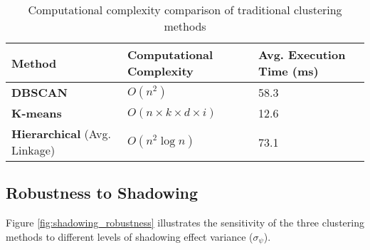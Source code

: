 \begin{table}[htbp]
    \centering
    \caption{Computational complexity comparison of traditional clustering methods}
    \label{tab:complexity_comparison}
    \begin{tcolorbox}[enhanced, colback=white, colframe=green!75!black, 
                      title={\textbf{Computational Performance Analysis}},
                      fonttitle=\bfseries, 
                      width=0.9\linewidth,
                      drop shadow southeast]
    \begin{tabular}{l>{\centering\arraybackslash}p{4cm}>{\centering\arraybackslash}p{3cm}}
        \toprule
        \rowcolor{green!20}
        \textbf{Method} & \textbf{Computational Complexity} & \textbf{Avg. Execution Time (ms)} \\
        \midrule
        \textbf{DBSCAN} & $O(n^2)$ & \cellcolor{yellow!10}58.3 \\
        \textbf{K-means} & $O(n \times k \times d \times i)$ & \cellcolor{green!10}12.6 \\
        \textbf{Hierarchical} (Avg. Linkage) & $O(n^2 \log n)$ & \cellcolor{red!10}73.1 \\
        \bottomrule
    \end{tabular}
    \end{tcolorbox}
\end{table}

\subsection{Robustness to Shadowing}

Figure \ref{fig:shadowing_robustness} illustrates the sensitivity of the three clustering methods to different levels of shadowing effect variance ($\sigma_\psi$).

